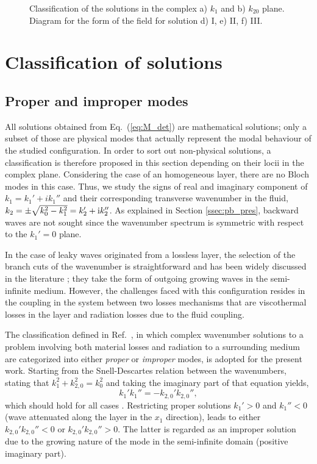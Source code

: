 \begin{figure}[htpb]
    \centering
    
    \caption{Classification of the solutions in the complex a) $k_1$ and b) $k_{20}$ plane. Diagram for the form of the field for solution d) I, e) II, f) III.}
    \label{fig:classification}
\end{figure}

\section{Classification of solutions}
\label{sec:homog_layer}
\subsection{Proper and improper modes}

All solutions obtained from Eq.~(\ref{eq:M_det}) are mathematical solutions; only a subset of those are physical modes that actually represent the modal behaviour of the studied configuration. In order to sort out non-physical solutions, a classification is therefore proposed in this section depending on their locii in the complex plane. Considering the case of an homogeneous layer, there are no Bloch modes in this case. Thus, we study the signs of real and imaginary component of $k_1=k_1' + i k_1''$ and their corresponding transverse wavenumber in the fluid, $k_{2} = \pm \sqrt{k_0^2 - k_1^2} = k_2' + \mathrm i k_2''$. As explained in Section \ref{ssec:pb_pres}, backward waves are not sought since the wavenumber spectrum is symmetric with respect to the $k_1' = 0$ plane. 

In the case of leaky waves originated from a lossless layer, the selection of the branch cuts of the wavenumber is straightforward and has been widely discussed in the literature \cite{goldstone1959,monticone2015}; they take the form of outgoing growing waves in the semi-infinite medium. However, the challenges faced with this configuration resides in the coupling in the system between two losses mechanisms that are viscothermal losses in the layer and radiation losses due to the fluid coupling.

The classification defined in Ref.~\cite{campione2011}, in which complex wavenumber solutions to a problem involving both material losses and radiation to a surrounding medium are categorized into either \textit{proper} or \textit{improper} modes, is adopted for the present work. Starting from the Snell-Descartes relation between the wavenumbers, stating that $k_1^2 + k_{2,0}^2 = k_0^2$ and taking the imaginary part of that equation yields,
\begin{equation}
    k_1' k_1'' = -k_{2,0}' k_{2,0}'',    
    \label{eq:im_snell}
\end{equation}
which should hold for all cases \cite{treyssede2014}. Restricting {proper} solutions $k_1'> 0$ and $k_1'' < 0$ (wave attenuated along the layer in the $x_1$ direction), leads to either $k_{2,0}' k_{2,0}'' < 0$ or $k_{2,0}'k_{2,0}'' > 0$. The latter is regarded as an {improper} solution due to the growing nature of the mode in the semi-infinite domain (positive imaginary part).

